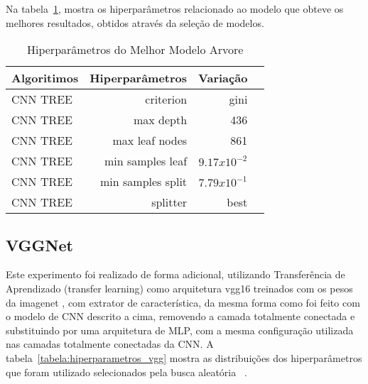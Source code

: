 Na tabela~\ref{tabela:hiperparametros_best_models_tree_}, mostra os hiperparâmetros relacionado ao modelo que obteve os melhores resultados, obtidos através da seleção de modelos.

\begin{table}[H]
\centering
\caption{Hiperparâmetros do Melhor Modelo Arvore}
\label{tabela:hiperparametros_best_models_tree_}
\def\arraystretch{1.2}
\begin{tabular}{@{}lrrr@{}}
\toprule
{\textbf{Algoritimos}} & {\textbf{Hiperparâmetros}} & {\textbf{Variação}}  \\
\midrule
CNN TREE & criterion & gini \\ 
CNN TREE & max depth &   436 \\ 
CNN TREE & max leaf nodes & 861 \\ 
CNN TREE & min samples leaf & $9.17x10^{-2}$ \\ %
CNN TREE & min samples split & $7.79x10^{-1}$ \\ %
CNN TREE & splitter & best \\ 
\bottomrule
\end{tabular}
\end{table}


\subsection{VGGNet}

Este experimento foi realizado de forma adicional, utilizando Transferência de Aprendizado (transfer learning) como arquitetura vgg16 treinados com os pesos da imagenet \cite{ImageNet}, com extrator de característica, da mesma forma como foi feito com o modelo de CNN descrito a cima, removendo a camada totalmente conectada e substituindo por uma arquitetura de MLP, com a mesma configuração utilizada nas camadas totalmente conectadas da CNN. A tabela~\ref{tabela:hiperparametros_vgg} mostra as distribuições dos hiperparâmetros que foram utilizado selecionados pela busca aleatória  ~\cite{Bergstra_James}.

